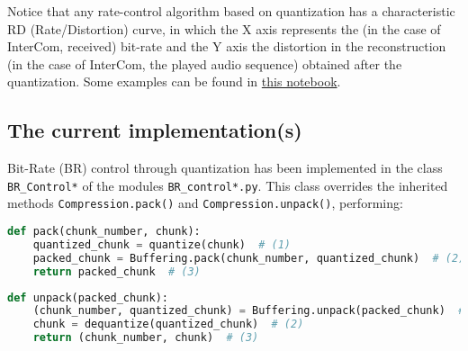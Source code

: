 Notice that any rate-control algorithm based on quantization has a
characteristic RD (Rate/Distortion) curve, in which the X axis
represents the (in the case of InterCom, received) bit-rate and the Y
axis the distortion in the reconstruction (in the case of InterCom,
the played audio sequence) obtained after the quantization. Some
examples can be found
in \href{https://github.com/Tecnologias-multimedia/Tecnologias-multimedia.github.io/blob/master/study_guide/10-br_control/audio_quantization.ipynb}{this
notebook}.

\subsection{The current implementation(s)}

Bit-Rate (BR) control through quantization has been implemented in the
class \verb|BR_Control*| of the modules
\texttt{BR\_control*.py}. This class overrides the inherited
methods \verb|Compression.pack()| and \verb|Compression.unpack()|,
performing:

\begin{lstlisting}[language=Python]
  def pack(chunk_number, chunk):
    quantized_chunk = quantize(chunk)  # (1)
    packed_chunk = Buffering.pack(chunk_number, quantized_chunk)  # (2)
    return packed_chunk  # (3)
\end{lstlisting}

\begin{lstlisting}[language=Python]
  def unpack(packed_chunk):
    (chunk_number, quantized_chunk) = Buffering.unpack(packed_chunk)  # (1)
    chunk = dequantize(quantized_chunk)  # (2)
    return (chunk_number, chunk)  # (3)
\end{lstlisting}

